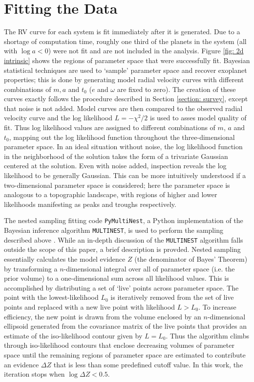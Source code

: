 \documentclass[12pt,manuscript]{aastex}
\begin{document}
\FloatBarrier
\section{Fitting the Data}
\label{section: fitting}

The RV curve for each system is fit immediately after it is generated.
Due to a shortage of computation time, roughly one third of the planets in the system (all with $\log a < 0$) were not fit and are not included in the analysis.
Figure \ref{fig: 2d intrinsic} shows the regions of parameter space that were successfully fit.
Bayesian statistical techniques are used to `sample' parameter space and recover exoplanet properties; this is done by generating model radial velocity curves with different combinations of $m, a$ and $t_0$ ($e$ and $\omega$ are fixed to zero). 
The creation of these curves exactly follows the procedure described in Section \ref{section: survey}, except that noise is not added.
Model curves are then compared to the observed radial velocity curve and the log likelihood $L=-\chi^2/2$ is used to asses model quality of fit.
Thus log likelihood values are assigned to different combinations of $m$, $a$ and $t_0$, mapping out the log likelihood function throughout the three-dimensional parameter space.
In an ideal situation without noise, the log likelihood function in the neighborhood of the solution takes the form of a trivariate Gaussian centered at the solution.
Even with noise added, inspection reveals the log likelihood to be generally Gaussian.
This can be more intuitively understood if a two-dimensional parameter space is considered; here the parameter space is analogous to a topographic landscape, with regions of higher and lower likelihoods manifesting as peaks and troughs respectively.

The nested sampling fitting code \texttt{PyMultiNest}, a Python implementation of the Bayesian inference algorithm \texttt{MULTINEST}, is used to perform the sampling described above \citep{buchner14,feroz09}.
While an in-depth discussion of the \texttt{MULTINEST} algorithm falls outside the scope of this paper, a brief description is provded.
Nested sampling essentially calculates the model evidence $Z$ (the denominator of Bayes' Theorem) by transforming a $n$-dimensional integral over all of parameter space (i.e. the prior volume) to a one-dimensional sum across all likelihood values. 
This is accomplished by distributing a set of `live' points across parameter space. 
The point with the lowest-likelihood $L_0$ is iteratively removed from the set of live points and replaced with a new live point with likelihood $L > L_0$.
To increase efficiency, the new point is drawn from the volume enclosed by an $n$-dimensional ellipsoid generated from the covariance matrix of the live points that provides an estimate of the iso-likelihood contour given by $L=L_0$.
Thus the algorithm climbs through iso-likelihood contours that enclose decreasing volumes of parameter space until the remaining regions of parameter space are estimated to contribute an evidence $\Delta Z$ that is less than some predefined cutoff value. 
In this work, the iteration stops when $\log \Delta Z <0.5$.
\end{document}
